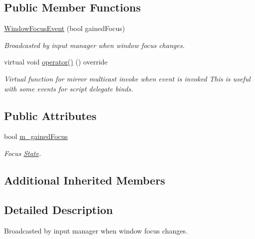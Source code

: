 \subsection*{Public Member Functions}
\begin{DoxyCompactItemize}
\item 
\hyperlink{classWindowFocusEvent_a9d8ad41bf0ce0be64b35f607c8480f9f}{Window\+Focus\+Event} (bool gained\+Focus)
\begin{DoxyCompactList}\small\item\em Broadcasted by input manager when window focus changes. \end{DoxyCompactList}\item 
\mbox{\label{classWindowFocusEvent_af1e6da711f4a71721b9a0f5c7cc175d3}} 
virtual void \hyperlink{classWindowFocusEvent_af1e6da711f4a71721b9a0f5c7cc175d3}{operator()} () override
\begin{DoxyCompactList}\small\item\em Virtual function for mirror multicast invoke when event is invoked This is useful with some events for script delegate binds. \end{DoxyCompactList}\end{DoxyCompactItemize}
\subsection*{Public Attributes}
\begin{DoxyCompactItemize}
\item 
\mbox{\label{classWindowFocusEvent_ab0b9bf94c294a8bbc02e8b8fc5bac197}} 
bool \hyperlink{classWindowFocusEvent_ab0b9bf94c294a8bbc02e8b8fc5bac197}{m\+\_\+gained\+Focus}
\begin{DoxyCompactList}\small\item\em Focus \hyperlink{classState}{State}. \end{DoxyCompactList}\end{DoxyCompactItemize}
\subsection*{Additional Inherited Members}


\subsection{Detailed Description}
Broadcasted by input manager when window focus changes. 

